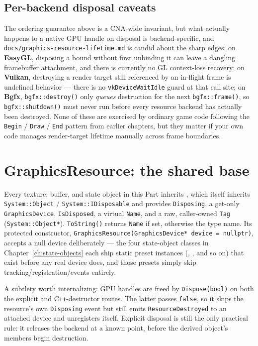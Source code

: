 \subsection{Per-backend disposal caveats}

The ordering guarantee above is a CNA-wide invariant, but what actually happens to a native GPU
handle on disposal is backend-specific, and \texttt{docs/graphics-resource-lifetime.md} is
candid about the sharp edges: on \textbf{EasyGL}, disposing a bound 
without first unbinding it can leave a dangling framebuffer attachment, and there is currently
no GL context-loss recovery; on \textbf{Vulkan}, destroying a render target still referenced by
an in-flight frame is undefined behavior --- there is no \texttt{vkDeviceWaitIdle} guard at
that call site; on \textbf{Bgfx}, \texttt{bgfx::destroy()} only \emph{queues} destruction for
the next \texttt{bgfx::frame()}, so \texttt{bgfx::shutdown()} must never run before every
resource backend has actually been destroyed. None of these are exercised by ordinary game code
following the \texttt{Begin} / \texttt{Draw} / \texttt{End} pattern from earlier chapters, but they
matter if your own code manages render-target lifetime manually across frame boundaries.

\section{GraphicsResource: the shared base}

Every texture, buffer, and state object in this Part inherits ,
which itself inherits \texttt{System::Object} / \texttt{System::IDisposable} and provides
\texttt{Disposing}, a get-only \texttt{GraphicsDevice}, \texttt{IsDisposed}, a virtual
\texttt{Name}, and a raw, caller-owned \texttt{Tag} (\texttt{System::Object*}).
\texttt{ToString()} returns \texttt{Name} if set, otherwise the type name. Its protected
constructor, \texttt{GraphicsResource(GraphicsDevice* device = nullptr)}, accepts a null device
deliberately --- the four state-object classes in Chapter~\ref{ch:state-objects} each ship
static preset instances (, ,
and so on) that exist before any real device does, and those presets simply skip
tracking/registration/events entirely.

A subtlety worth internalizing: GPU handles are freed by \texttt{Dispose(bool)} on both the
explicit and C\texttt{++}-destructor routes. The latter passes \texttt{false}, so it skips the
resource's own \texttt{Disposing} event but still emits \texttt{ResourceDestroyed} to an attached
device and unregisters itself. Explicit disposal is still the only practical rule: it releases
the backend at a known point, before the derived object's members begin destruction.

